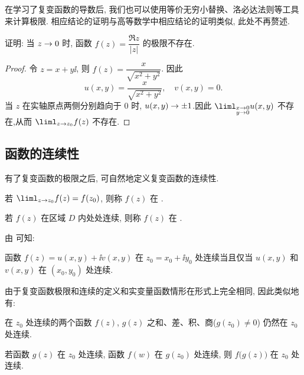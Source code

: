 在学习了复变函数的导数后, 我们也可以使用等价无穷小替换、洛必达法则等工具来计算极限. 相应结论的证明与高等数学中相应结论的证明类似, 此处不再赘述.

\begin{example}
  证明: 当 $z\rightarrow 0$ 时, 函数 $f(z)=\dfrac{\Re z}{|z|}$ 的极限不存在.
\end{example}

\begin{proof}
  令 $z=x+y\ii$, 则 $f(z)=\dfrac x{\sqrt{x^2+y^2}}$.
  因此
  \[
    u(x,y)=\frac x{\sqrt{x^2+y^2}},\quad v(x,y)=0.
  \]
  当 $z$ 在实轴原点两侧分别趋向于 $0$ 时, $u(x,y)\rightarrow\pm1$.因此 $\liml_{\substack{x\ra 0\\y\ra 0}}u(x,y)$ 不存在,从而 $\liml_{z\ra z_0}f(z)$ 不存在.
\end{proof}


\subsection{函数的连续性}

有了复变函数的极限之后, 可自然地定义复变函数的连续性.
\begin{definition}
  \label{def:continuous}
  \begin{enuma}
    \item 若 $\liml_{z\ra z_0}f(z)=f(z_0)$, 则称 $f(z)$ 在 .
    \item 若 $f(z)$ 在区域 $D$ 内处处连续, 则称 $f(z)$ 在 .
  \end{enuma}
\end{definition}

由 可知:
\begin{theorem}
  函数 $f(z)=u(x,y)+\ii v(x,y)$ 在 $z_0=x_0+\ii y_0$ 处连续当且仅当 $u(x,y)$ 和 $v(x,y)$ 在 $(x_0,y_0)$ 处连续.
\end{theorem}

由于复变函数极限和连续的定义和实变量函数情形在形式上完全相同, 因此类似地有:
\begin{theorem}
  \begin{enuma}
    \item 在 $z_0$ 处连续的两个函数 $f(z)$, $g(z)$ 之和、差、积、商($g(z_0)\neq 0$) 仍然在 $z_0$ 处连续.
    \item 若函数 $g(z)$ 在 $z_0$ 处连续, 函数 $f(w)$ 在 $g(z_0)$ 处连续, 则 $f\bigl(g(z)\bigr)$ 在 $z_0$ 处连续.
  \end{enuma}
\end{theorem}

